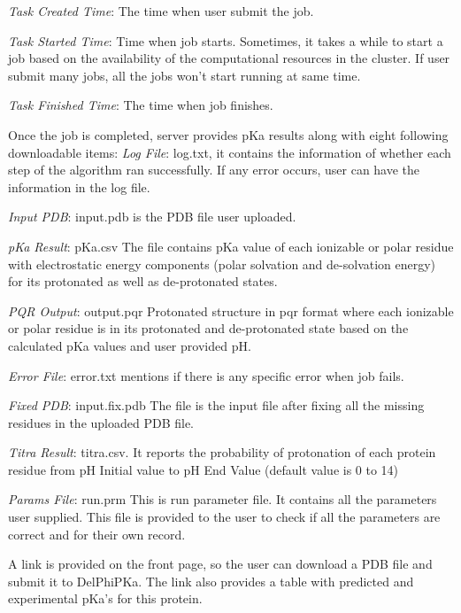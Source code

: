 \documentclass[9pt,tutorial]{livecoms}
\begin{document}
\textit{Task Created Time}: The time when user submit the job.

\textit{Task Started Time}: Time when job starts. Sometimes, it takes a while to start a job based on the availability of the computational resources in the cluster. If user submit many jobs, all the jobs won’t start running at same time.

\textit{Task Finished Time}: The time when job finishes.

Once the job is completed, server provides pKa results along with eight following downloadable items:
\textit{Log File}: log.txt, it contains the information of whether each step of the algorithm ran successfully. If any error occurs, user can have the information in the log file.

\textit{Input PDB}: input.pdb is the PDB file user uploaded.

\textit{pKa Result}: pKa.csv The file contains pKa value of each ionizable or polar residue with electrostatic energy components (polar solvation and de-solvation energy) for its protonated as well as de-protonated states.

\textit{PQR Output}: output.pqr Protonated structure in pqr format where each ionizable or polar residue is in its protonated and de-protonated state based on the calculated pKa values and user provided pH.

\textit{Error File}: error.txt mentions if there is any specific error when job fails.

\textit{Fixed PDB}: input.fix.pdb The file is the input file after fixing all the missing residues in the uploaded PDB file.

\textit{Titra Result}: titra.csv.   It reports the probability of protonation of each protein residue from pH Initial value to pH End Value (default value is 0 to 14)

\textit{Params File}: run.prm This is run parameter file. It contains all the parameters user supplied. This file is provided to the user to check if all the parameters are correct and for their own record. 

A link is provided on the front page, so the user can download a PDB file and submit it to DelPhiPKa. The link also provides a table with predicted and experimental pKa's for this protein.
\end{document}

